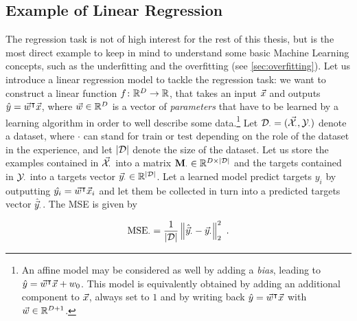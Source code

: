 
\subsection{Example of Linear Regression}
The regression task is not of high interest for the rest of this thesis, but is the most direct example to keep in mind to understand some basic Machine Learning concepts, such as the underfitting and the overfitting (see \ref{sec:overfitting}). Let us introduce a linear regression model to tackle the regression task: we want to construct a linear function $f\colon \mathbb{R}^D \rightarrow \mathbb{R}$, that takes an input $\vec{x}$ and outputs $\hat{y} = \vec{w}^\intercal \vec{x}$, where $\vec{w}\in \mathbb{R}^D$ is a vector of \emph{parameters} that have to be learned by a learning algorithm in order to well describe some data.\footnote{An affine model may be considered as well by adding a \emph{bias}, leading to $\hat{y} = \vec{w}^\intercal \vec{x}+w_0$. This model is equivalently obtained by adding an additional component to $\vec{x}$, always set to $1$ and by writing back $\hat{y} = \vec{w}^\intercal \vec{x}$ with $\vec{w}\in \mathbb{R}^{D+1}$. } 
Let $\mathcal{D}_{\cdot} = (\vec{\mathcal{X}}_{\cdot}, \mathcal{Y}_{\cdot})$ denote a dataset, where $\cdot$ can stand for $\text{train}$ or $\text{test}$ depending on the role of the dataset in the experience, and let $\lvert\mathcal{D}\rvert$ denote the size of the dataset. Let us store the examples contained in $\vec{\mathcal{X}}_{\cdot}$ into a matrix $\textbf{M}_{\cdot}\in \mathbb{R}^{D \times \lvert\mathcal{D}\rvert}$ and the targets contained in $\mathcal{Y}_{\cdot}$ into a targets vector $\vec{y}_{\cdot}\in \mathbb{R}^{\lvert\mathcal{D}\rvert}$. Let a learned model predict targets $y_i$ by outputting $\hat{y_i} = \vec{w}^\intercal\vec{x}_i$ and let them be collected in turn into a predicted targets vector $\hat{\vec{y}}_{\cdot}$. The MSE is given by 

\begin{equation}
 \mathrm{MSE_{\cdot}} = \frac{1}{\lvert\mathcal{D}\rvert} \left\lVert\hat{\vec{y}}_{\cdot}-\vec{y}_{\cdot}\right\rVert^2_2 \mbox{ .}
\end{equation}

